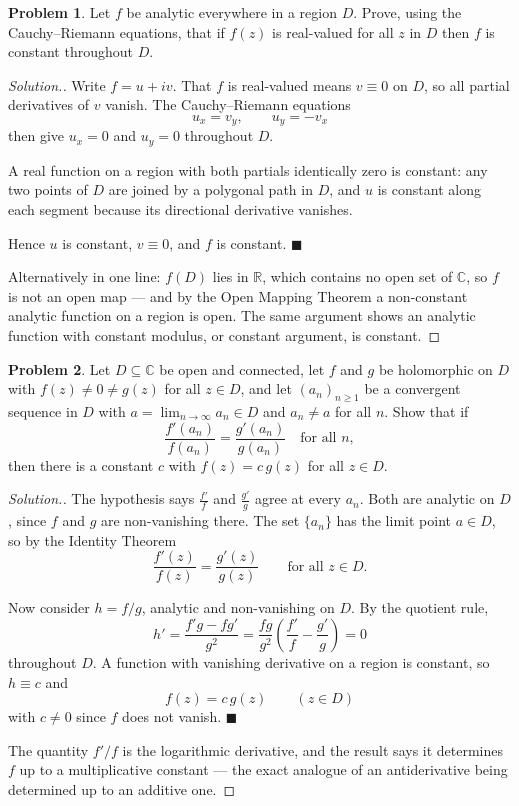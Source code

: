 \documentclass[11pt,a4paper]{article}
\theoremstyle{definition}
\newtheorem{problemx}{Problem}[section]
\newenvironment{problem}{\begin{problemx}}{\end{problemx}}
\newenvironment{solution}
  {\renewcommand{\qedsymbol}{}\begin{proof}[\textit{Solution}.]}
  {\end{proof}}
\begin{document}
\begin{problem}
Let $f$ be analytic everywhere in a region $D$. Prove, using the
Cauchy--Riemann equations, that if $f(z)$ is real-valued for all $z$ in $D$ then
$f$ is constant throughout $D$.
\end{problem}

\begin{solution}
Write $f = u + iv$. That $f$ is real-valued means $v \equiv 0$ on $D$, so all
partial derivatives of $v$ vanish. The Cauchy--Riemann equations
$$u_x = v_y,\qquad u_y = -v_x$$
then give $u_x = 0$ and $u_y = 0$ throughout $D$.

A real function on a region with both partials identically zero is constant: any
two points of $D$ are joined by a polygonal path in $D$, and $u$ is constant along
each segment because its directional derivative vanishes.

Hence $u$ is constant, $v \equiv 0$, and $f$ is constant. $\blacksquare$

Alternatively in one line: $f(D)$ lies in $\mathbb{R}$, which contains no open set
of $\mathbb{C}$, so $f$ is not an open map --- and by the Open Mapping Theorem a
non-constant analytic function on a region is open. The same argument shows an
analytic function with constant modulus, or constant argument, is constant.
\end{solution}


\begin{problem}
Let $D \subseteq \mathbb{C}$ be open and connected, let $f$ and $g$ be
holomorphic on $D$ with $f(z) \neq 0 \neq g(z)$ for all $z \in D$, and let
$(a_n)_{n \geq 1}$ be a convergent sequence in $D$ with
$a = \lim_{n\rightarrow\infty} a_n \in D$ and $a_n \neq a$ for all $n$. Show that
if
$$\frac{f'(a_n)}{f(a_n)} = \frac{g'(a_n)}{g(a_n)}
\quad \text{for all } n,$$
then there is a constant $c$ with $f(z) = c\,g(z)$ for all $z \in D$.
\end{problem}

\begin{solution}
The hypothesis says $\frac{f'}{f}$ and $\frac{g'}{g}$ agree at every $a_n$. Both
are analytic on $D$, since $f$ and $g$ are non-vanishing there. The set
$\{a_n\}$ has the limit point $a \in D$, so by the Identity Theorem
$$\frac{f'(z)}{f(z)} = \frac{g'(z)}{g(z)} \qquad \text{for all } z \in D .$$

Now consider $h = f/g$, analytic and non-vanishing on $D$. By the quotient rule,
$$h' = \frac{f'g - fg'}{g^{2}}
= \frac{fg}{g^{2}}\left(\frac{f'}{f} - \frac{g'}{g}\right) = 0$$
throughout $D$. A function with vanishing derivative on a region is constant, so
$h \equiv c$ and
$$\boxed{f(z) = c\,g(z) \qquad (z \in D)}$$
with $c \neq 0$ since $f$ does not vanish. $\blacksquare$

The quantity $f'/f$ is the logarithmic derivative, and the result says it
determines $f$ up to a multiplicative constant --- the exact analogue of an
antiderivative being determined up to an additive one.
\end{solution}
\end{document}
